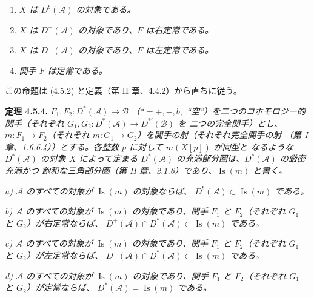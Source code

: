 \clearpage
{}%
\begingroup\small\setlength{\parskip}{0pt}\setlength{\emergencystretch}{1.5em}
\setlength{\abovedisplayskip}{4pt plus 2pt minus 2pt}%
\setlength{\belowdisplayskip}{4pt plus 2pt minus 2pt}%

\begin{enumerate}
\item[1)] \textit{$X$ は $D^b(\mathcal A)$ の対象である。}
\item[2)] \textit{$X$ は $D^+(\mathcal A)$ の対象であり、$F$ は右定常である。}
\item[3)] \textit{$X$ は $D^-(\mathcal A)$ の対象であり、$F$ は左定常である。}
\item[4)] \textit{関手 $F$ は定常である。}
\end{enumerate}

この命題は (4.5.2) と定義（第 II 章、4.4.2）から直ちに従う。

\medskip\noindent\textbf{定理 4.5.4.}\quad
\textit{$F_1,F_2\colon D^*(\mathcal A)\longrightarrow\mathcal B$
（$*=+,-,b,{}$ ``空''）を二つのコホモロジー的関手（それぞれ
$G_1,G_2\colon D^*(\mathcal A)\longrightarrow D^{*'}(\mathcal B)$ を
二つの完全関手）とし、$m\colon F_1\longrightarrow F_2$（それぞれ
$m\colon G_1\longrightarrow G_2$）を関手の射（それぞれ完全関手の射
（第 I 章、1.6.6.4））とする。各整数 $p$ に対して $m(X[p])$ が同型と
なるような $D^*(\mathcal A)$ の対象 $X$ によって定まる
$D^*(\mathcal A)$ の充満部分圏は、$D^*(\mathcal A)$ の厳密充満かつ
飽和な三角部分圏（第 II 章、2.1.6）であり、$\operatorname{Is}(m)$ と書く。}

\noindent\textit{a) $\mathcal A$ のすべての対象が
$\operatorname{Is}(m)$ の対象ならば、
$D^b(\mathcal A)\subset\operatorname{Is}(m)$ である。}

\noindent\textit{b) $\mathcal A$ のすべての対象が
$\operatorname{Is}(m)$ の対象であり、関手 $F_1$ と $F_2$（それぞれ
$G_1$ と $G_2$）が右定常ならば、
$D^+(\mathcal A)\cap D^*(\mathcal A)\subset\operatorname{Is}(m)$ である。}

\noindent\textit{c) $\mathcal A$ のすべての対象が
$\operatorname{Is}(m)$ の対象であり、関手 $F_1$ と $F_2$（それぞれ
$G_1$ と $G_2$）が左定常ならば、
$D^-(\mathcal A)\cap D^*(\mathcal A)\subset\operatorname{Is}(m)$ である。}

\noindent\textit{d) $\mathcal A$ のすべての対象が
$\operatorname{Is}(m)$ の対象であり、関手 $F_1$ と $F_2$（それぞれ
$G_1$ と $G_2$）が定常ならば、
$D^*(\mathcal A)=\operatorname{Is}(m)$ である。}

